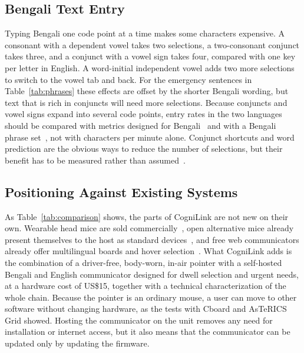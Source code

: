 \documentclass[journal]{IEEEtran}
\begin{document}
\subsection{Bengali Text Entry}
\label{sec:disc_bengali}
Typing Bengali one code point at a time makes some characters expensive. A consonant with a dependent vowel takes two selections, a two-consonant conjunct takes three, and a conjunct with a vowel sign takes four, compared with one key per letter in English. A word-initial independent vowel adds two more selections to switch to the vowel tab and back. For the emergency sentences in Table~\ref{tab:phrases} these effects are offset by the shorter Bengali wording, but text that is rich in conjuncts will need more selections. Because conjuncts and vowel signs expand into several code points, entry rates in the two languages should be compared with metrics designed for Bengali~\cite{sarcar2015} and with a Bengali phrase set~\cite{arif2016}, not with characters per minute alone. Conjunct shortcuts and word prediction are the obvious ways to reduce the number of selections, but their benefit has to be measured rather than assumed~\cite{koester1996}.

\subsection{Positioning Against Existing Systems}
As Table~\ref{tab:comparison} shows, the parts of CogniLink are not new on their own. Wearable head mice are sold commercially~\cite{montechquha,glassouse}, open alternative mice already present themselves to the host as standard devices~\cite{flipmouse}, and free web communicators already offer multilingual boards and hover selection~\cite{cboard,astericsgrid}. What CogniLink adds is the combination of a driver-free, body-worn, in-air pointer with a self-hosted Bengali and English communicator designed for dwell selection and urgent needs, at a hardware cost of US\$15, together with a technical characterization of the whole chain. Because the pointer is an ordinary mouse, a user can move to other software without changing hardware, as the tests with Cboard and AsTeRICS Grid showed. Hosting the communicator on the unit removes any need for installation or internet access, but it also means that the communicator can be updated only by updating the firmware.
\end{document}
